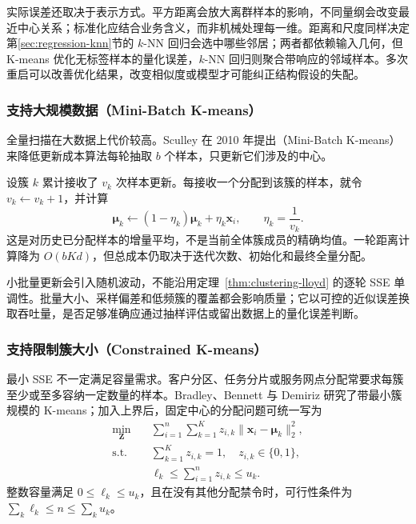 实际误差还取决于表示方式。平方距离会放大离群样本的影响，不同量纲会改变最近中心关系；标准化应结合业务含义，而非机械处理每一维。距离和尺度同样决定第\ref{sec:regression-knn}节的 $k$-NN 回归会选中哪些邻居；两者都依赖输入几何，但 K-means 优化无标签样本的量化误差，$k$-NN 回归则聚合带响应的邻域样本。多次重启可以改善优化结果，改变相似度或模型才可能纠正结构假设的失配。

\subsubsection{支持大规模数据（Mini-Batch K-means）}

全量扫描在大数据上代价较高。Sculley 在 2010 年提出（Mini-Batch K-means）来降低更新成本算法每轮抽取 $b$ 个样本，只更新它们涉及的中心。

设簇 $k$ 累计接收了 $v_k$ 次样本更新。每接收一个分配到该簇的样本，就令 $v_k\leftarrow v_k+1$，并计算
\begin{equation}
 \bm{\mu}_k\leftarrow
 (1-\eta_k)\bm{\mu}_k+\eta_k\bm{x}_i,
 \qquad \eta_k=\frac{1}{v_k}.
 \label{eq:clustering-minibatch}
\end{equation}
这是对历史已分配样本的增量平均，不是当前全体簇成员的精确均值。一轮距离计算降为 $O(bKd)$，但总成本仍取决于迭代次数、初始化和最终全量分配。

小批量更新会引入随机波动，不能沿用定理~\ref{thm:clustering-lloyd} 的逐轮 SSE 单调性。批量大小、采样偏差和低频簇的覆盖都会影响质量；它以可控的近似误差换取吞吐量，是否足够准确应通过抽样评估或留出数据上的量化误差判断。

\subsubsection{支持限制簇大小（Constrained K-means）}
\label{sec:clustering-capacity}

最小 SSE 不一定满足容量需求。客户分区、任务分片或服务网点分配常要求每簇至少或至多容纳一定数量的样本。Bradley、Bennett 与 Demiriz 研究了带最小簇规模的 K-means；加入上界后，固定中心的分配问题可统一写为
\begin{equation}
 \begin{aligned}
 \min_{\bm{Z}}\quad&
   \sum_{i=1}^n\sum_{k=1}^K
   z_{i,k}\lVert\bm{x}_i-\bm{\mu}_k\rVert_2^2,\\
 \text{s.t.}\quad&
   \sum_{k=1}^K z_{i,k}=1,\quad z_{i,k}\in\{0,1\},\\
 & \ell_k\leq\sum_{i=1}^n z_{i,k}\leq u_k.
 \end{aligned}
 \label{eq:clustering-capacity}
\end{equation}
整数容量满足 $0\leq\ell_k\leq u_k$，且在没有其他分配禁令时，可行性条件为 $\sum_k\ell_k\leq n\leq\sum_ku_k$。

